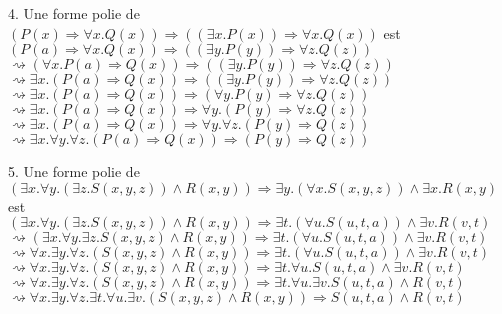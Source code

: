 \documentclass[11pt,letterpaper]{article}
\newcommand\tab[1][12pt]{\hspace*{#1}}
\begin{document}
4. Une forme polie de $(P(x) \Rightarrow \forall x.Q(x)) \Rightarrow ((\exists x.P(x))  \Rightarrow \forall x.Q(x))$ est\\\tab
$(P(a) \Rightarrow \forall x.Q(x)) \Rightarrow ((\exists y.P(y))  \Rightarrow \forall z.Q(z))$\\\tab
$\rightsquigarrow (\forall x.P(a) \Rightarrow Q(x)) \Rightarrow ((\exists y.P(y))  \Rightarrow \forall z.Q(z))$\\\tab
$\rightsquigarrow \exists x.(P(a) \Rightarrow Q(x)) \Rightarrow ((\exists y.P(y))  \Rightarrow \forall z.Q(z))$\\\tab
$\rightsquigarrow \exists x.(P(a) \Rightarrow Q(x)) \Rightarrow (\forall y.P(y)  \Rightarrow \forall z.Q(z))$\\\tab
$\rightsquigarrow \exists x.(P(a) \Rightarrow Q(x)) \Rightarrow \forall y.(P(y)  \Rightarrow \forall z.Q(z))$\\\tab
$\rightsquigarrow \exists x.(P(a) \Rightarrow Q(x)) \Rightarrow \forall y.\forall z.(P(y)  \Rightarrow Q(z))$\\\tab
$\rightsquigarrow \exists x.\forall y.\forall z.(P(a) \Rightarrow Q(x)) \Rightarrow (P(y)  \Rightarrow Q(z))$

\vspace{13px}

5. Une forme polie de $(\exists x.\forall y.(\exists z.S(x,y,z)) \wedge R(x,y)) \Rightarrow \exists y.(\forall x.S(x,y,z)) \wedge \exists x.R(x,y)$ est\\\tab
$(\exists x.\forall y.(\exists z.S(x,y,z)) \wedge R(x,y)) \Rightarrow \exists t.(\forall u.S(u,t,a)) \wedge \exists v.R(v,t)$\\\tab
$\rightsquigarrow (\exists x.\forall y.\exists z.S(x,y,z) \wedge R(x,y)) \Rightarrow \exists t.(\forall u.S(u,t,a)) \wedge \exists v.R(v,t)$\\\tab
$\rightsquigarrow \forall x.\exists y.\forall z.(S(x,y,z) \wedge R(x,y)) \Rightarrow \exists t.(\forall u.S(u,t,a)) \wedge \exists v.R(v,t)$\\\tab
$\rightsquigarrow \forall x.\exists y.\forall z.(S(x,y,z) \wedge R(x,y)) \Rightarrow \exists t.\forall u.S(u,t,a) \wedge \exists v.R(v,t)$\\\tab
$\rightsquigarrow \forall x.\exists y.\forall z.(S(x,y,z) \wedge R(x,y)) \Rightarrow \exists t.\forall u.\exists v.S(u,t,a) \wedge R(v,t)$\\\tab
$\rightsquigarrow \forall x.\exists y.\forall z.\exists t.\forall u.\exists v.(S(x,y,z) \wedge R(x,y)) \Rightarrow S(u,t,a) \wedge R(v,t)$
\end{document}
